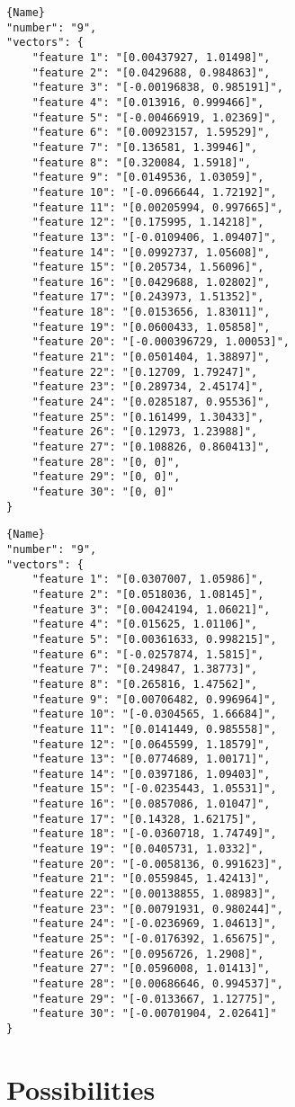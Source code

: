 \noindent\begin{minipage}{.45\textwidth}
\begin{lstlisting}[caption={\code{calcOpticalFlowPyrLK} values},frame=tlrb,basicstyle=\tiny]{Name}
"number": "9",
"vectors": {
	"feature 1": "[0.00437927, 1.01498]",
	"feature 2": "[0.0429688, 0.984863]",
	"feature 3": "[-0.00196838, 0.985191]",
	"feature 4": "[0.013916, 0.999466]",
	"feature 5": "[-0.00466919, 1.02369]",
	"feature 6": "[0.00923157, 1.59529]",
	"feature 7": "[0.136581, 1.39946]",
	"feature 8": "[0.320084, 1.5918]",
	"feature 9": "[0.0149536, 1.03059]",
	"feature 10": "[-0.0966644, 1.72192]",
	"feature 11": "[0.00205994, 0.997665]",
	"feature 12": "[0.175995, 1.14218]",
	"feature 13": "[-0.0109406, 1.09407]",
	"feature 14": "[0.0992737, 1.05608]",
	"feature 15": "[0.205734, 1.56096]",
	"feature 16": "[0.0429688, 1.02802]",
	"feature 17": "[0.243973, 1.51352]",
	"feature 18": "[0.0153656, 1.83011]",
	"feature 19": "[0.0600433, 1.05858]",
	"feature 20": "[-0.000396729, 1.00053]",
	"feature 21": "[0.0501404, 1.38897]",
	"feature 22": "[0.12709, 1.79247]",
	"feature 23": "[0.289734, 2.45174]",
	"feature 24": "[0.0285187, 0.95536]",
	"feature 25": "[0.161499, 1.30433]",
	"feature 26": "[0.12973, 1.23988]",
	"feature 27": "[0.108826, 0.860413]",
	"feature 28": "[0, 0]",
	"feature 29": "[0, 0]",
	"feature 30": "[0, 0]"
}
\end{lstlisting}
\end{minipage}\hfill
\begin{minipage}{.45\textwidth}
	\begin{lstlisting}[caption={\code{compute\_lk\_gpu} values},frame=tlrb,basicstyle=\tiny]{Name}
"number": "9",
"vectors": {
	"feature 1": "[0.0307007, 1.05986]",
	"feature 2": "[0.0518036, 1.08145]",
	"feature 3": "[0.00424194, 1.06021]",
	"feature 4": "[0.015625, 1.01106]",
	"feature 5": "[0.00361633, 0.998215]",
	"feature 6": "[-0.0257874, 1.5815]",
	"feature 7": "[0.249847, 1.38773]",
	"feature 8": "[0.265816, 1.47562]",
	"feature 9": "[0.00706482, 0.996964]",
	"feature 10": "[-0.0304565, 1.66684]",
	"feature 11": "[0.0141449, 0.985558]",
	"feature 12": "[0.0645599, 1.18579]",
	"feature 13": "[0.0774689, 1.00171]",
	"feature 14": "[0.0397186, 1.09403]",
	"feature 15": "[-0.0235443, 1.05531]",
	"feature 16": "[0.0857086, 1.01047]",
	"feature 17": "[0.14328, 1.62175]",
	"feature 18": "[-0.0360718, 1.74749]",
	"feature 19": "[0.0405731, 1.0332]",
	"feature 20": "[-0.0058136, 0.991623]",
	"feature 21": "[0.0559845, 1.42413]",
	"feature 22": "[0.00138855, 1.08983]",
	"feature 23": "[0.00791931, 0.980244]",
	"feature 24": "[-0.0236969, 1.04613]",
	"feature 25": "[-0.0176392, 1.65675]",
	"feature 26": "[0.0956726, 1.2908]",
	"feature 27": "[0.0596008, 1.01413]",
	"feature 28": "[0.00686646, 0.994537]",
	"feature 29": "[-0.0133667, 1.12775]",
	"feature 30": "[-0.00701904, 2.02641]"
}
\end{lstlisting}
\end{minipage}



\section{Possibilities}


